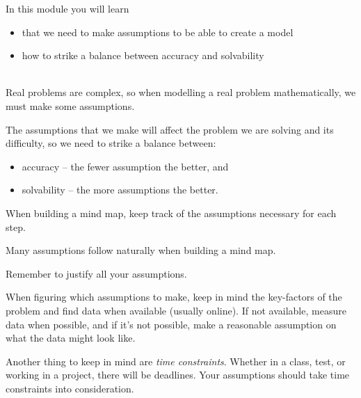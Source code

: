 \begin{siam}
	
In this module you will learn
\begin{itemize}
	\item that we need to make assumptions to be able to create a model
	\item how to strike a balance between accuracy and solvability
\end{itemize}

\hfill \\




Real problems are complex, so when modelling a real problem mathematically, we must make some assumptions. 

The assumptions that we make will affect the problem we are solving and its difficulty, so we need to strike a balance between:
\begin{itemize}
\item accuracy -- the fewer assumption the better, and
\item solvability -- the more assumptions the better.
\end{itemize}

\begin{annotation}
	\begin{goals}
		When building a mind map, keep track of the assumptions necessary for each step.
	\end{goals}
\end{annotation}

Many assumptions follow naturally when building a mind map. \\


\begin{annotation}
	\begin{goals}
		Remember to justify all your assumptions.
	\end{goals}
\end{annotation}

When figuring which assumptions to make, keep in mind the key-factors of the problem and find data when available (usually online). 
If not available, measure data when possible, and if it's not possible, make a reasonable assumption on what the data might look like.

Another thing to keep in mind are \emph{time constraints}. Whether in a class, test, or working in a project, there will be deadlines. Your assumptions should take time constraints into consideration. 




\end{siam}
